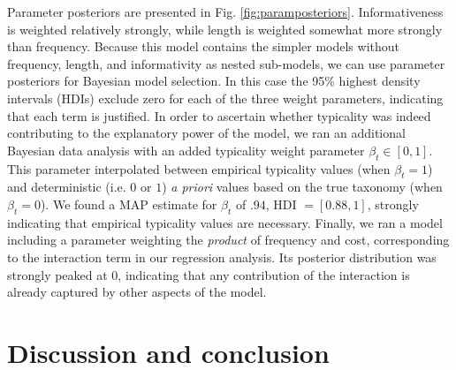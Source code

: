 \documentclass[10pt,letterpaper]{article}
\newcommand{\red}[1]{\textcolor{Red}{#1}}
\newcommand{\tableref}[1]{Table \ref{#1}}
\newcommand{\figref}[1]{Fig.~\ref{#1}}
\begin{document}
Parameter posteriors are presented in Fig. \ref{fig:paramposteriors}. 
Informativeness is weighted relatively strongly, while length is weighted somewhat more strongly than frequency.
Because this model contains the simpler models without frequency, length, and informativity as nested sub-models, we can use parameter posteriors for Bayesian model selection.
In this case the 95\% highest density intervals (HDIs) exclude zero for each of the three weight parameters, indicating that each term is justified.
In order to ascertain whether typicality was indeed contributing to the explanatory power of the model, we ran an additional Bayesian data analysis with an added typicality weight parameter $\beta_t \in [0,1]$. This parameter interpolated between empirical typicality values (when $\beta_t {=} 1$) and deterministic (i.e. $0$ or $1$) \emph{a priori} values based on the true taxonomy (when $\beta_t {=} 0$).
We found a MAP estimate for $\beta_t$ of $.94$, HDI $= [0.88,1]$, strongly indicating that empirical typicality values are necessary.  
Finally, we ran a model including a parameter weighting the \emph{product} of frequency and cost, corresponding to the interaction term in our regression analysis. Its posterior distribution was strongly peaked at 0, indicating that any contribution of the interaction is already captured by other aspects of the model. 




\section{\bf Discussion and conclusion}
\end{document}
